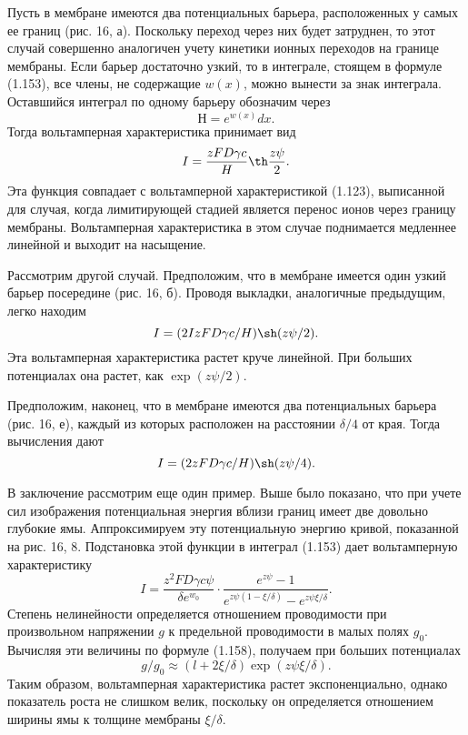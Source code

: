 Пусть в мембране имеются два потенциальных барьера, расположенных у самых ее
границ (рис. 16, а). Поскольку переход через них будет затруднен, то этот случай
совершенно аналогичен учету кинетики ионных переходов на границе мембраны.
Если барьер достаточно узкий, то в интеграле, стоящем в формуле (1.153), все
члены, не содержащие \( w(x) \), можно вынести за знак интеграла. Оставшийся
интеграл по одному барьеру обозначим через
\begin{equation}
    Н = e^{w(x)} dx.
\end{equation}
Тогда вольтамперная характеристика принимает вид
\begin{equation}
    I = \frac{zFD\gamma c}{H}\th\frac{z\psi}{2}.
\end{equation}
Эта функция совпадает с вольтамперной характеристикой (1.123), выписанной для
случая, когда лимитирующей стадией является перенос ионов через границу
мембраны. Вольтамперная характеристика в этом случае поднимается медленнее
линейной и выходит на насыщение.

Рассмотрим другой случай. Предположим, что в мембране имеется один узкий барьер
посередине (рис. 16, б). Проводя выкладки, аналогичные предыдущим, легко находим
\begin{equation}
    I = (2IzFD\gamma c/H) \sh (z\psi/2).
\end{equation}
Эта вольтамперная характеристика растет круче линейной. При больших потенциалах
она растет, как \( \exp (z\psi/2) \).

Предположим, наконец, что в мембране имеются два потенциальных барьера
(рис. 16, е), каждый из которых расположен на расстоянии \( \delta /4 \) от
края. Тогда вычисления дают
\begin{equation}
    I = (2zFD\gamma c/H) \sh(z\psi/4).
\end{equation}

В заключение рассмотрим еще один пример. Выше было показано, что при учете сил
изображения потенциальная энергия вблизи границ имеет две довольно глубокие ямы.
Аппроксимируем эту потенциальную энергию кривой, показанной на рис. 16, 8.
Подстановка этой функции в интеграл (1.153) дает вольтамперную характеристику
\begin{equation}
    I = \frac{z^2FD\gamma c\psi}{\delta e^{w_0}}\cdot
        \frac{e^{z\psi}-1}{e^{z\psi(1-\xi/\delta)} - e^{z\psi\xi/\delta}}.
\end{equation}
Степень нелинейности определяется отношением проводимости при произвольном
напряжении \( g \) к предельной проводимости в малых полях \( g_0 \). Вычисляя
эти величины по формуле (1.158), получаем при больших потенциалах
\begin{equation}
    g/g_0 \approx (l + 2\xi/\delta)\exp(z\psi\xi/\delta).
\end{equation}
Таким образом, вольтамперная характеристика растет экспоненциально, однако
показатель роста не слишком велик, поскольку он определяется отношением ширины
ямы к толщине мембраны \( \xi/\delta \).

